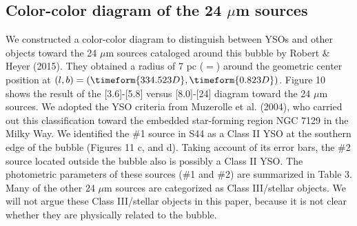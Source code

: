 \documentclass[onecolumn]{pasj01}
\begin{document}
{{{{{{{{\subsection{Color-color diagram of the 24 $\mu$m sources}
We {constructed a} color-color diagram to distinguish between YSOs and other {objects} toward the 24 $\mu$m sources cataloged {around this bubble} by Robert \& Heyer (2015). {They obtained a} radius of 7 pc ($=$) around the geometric center position at $(l,b)=(\timeform{334.523D}, \timeform{0.823D})$.
{Figure 10} shows the result {of the} [3.6]-[5.8] versus [8.0]-[24] diagram toward the 24 $\mu$m sources. 
We adopted the YSO criteria from Muzerolle et al. (2004), {who} carried out this classification toward the embedded star-forming region NGC 7129 in the Milky Way. 
We identified the \#1 source {in S44} as {a} Class II YSO at the southern edge of the bubble ({Figures 11 c, and d}). {Taking account of its error bars, the \#2 source located outside the bubble also is possibly a Class II YSO. {The photometric parameters of these sources (\#1 and \#2) are summarized in Table 3. Many of the other 24 $\mu$m sources are categorized as Class III/stellar objects. We will not argue these Class III/stellar objects in this paper, because it is not clear whether they are physically related to the bubble. }}

}}}}}}}}
\end{document}
